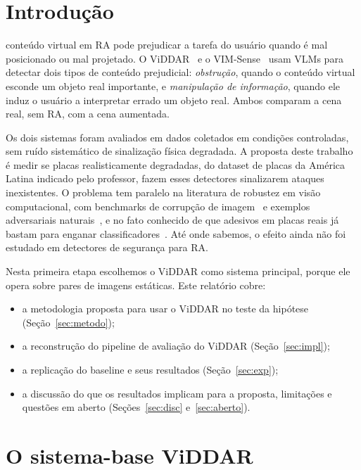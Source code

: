 \documentclass[journal,onecolumn]{IEEEtran}
\begin{document}
\section{Introdução}

 conteúdo virtual em RA pode prejudicar a tarefa do usuário quando é mal posicionado
ou mal projetado. O ViDDAR~\cite{viddar} e o VIM-Sense~\cite{vimsense} usam VLMs para detectar dois
tipos de conteúdo prejudicial: \emph{obstrução}, quando o conteúdo virtual esconde um objeto real
importante, e \emph{manipulação de informação}, quando ele induz o usuário a interpretar errado um
objeto real. Ambos comparam a cena real, sem RA, com a cena aumentada.

Os dois sistemas foram avaliados em dados coletados em condições controladas, sem ruído sistemático de
sinalização física degradada. A proposta deste trabalho é medir se placas realisticamente degradadas,
do dataset de placas da América Latina indicado pelo professor, fazem esses detectores sinalizarem
ataques inexistentes. O problema tem paralelo na literatura de robustez em visão computacional, com
benchmarks de corrupção de imagem~\cite{hendrycks2019} e exemplos adversariais
naturais~\cite{hendrycks2021}, e no fato conhecido de que adesivos em placas reais já bastam para
enganar classificadores~\cite{eykholt2018}. Até onde sabemos, o efeito ainda não foi estudado em
detectores de segurança para RA.

Nesta primeira etapa escolhemos o ViDDAR como sistema principal, porque ele opera sobre pares de
imagens estáticas. Este relatório cobre:
\begin{itemize}
\item a metodologia proposta para usar o ViDDAR no teste da hipótese (Seção~\ref{sec:metodo});
\item a reconstrução do pipeline de avaliação do ViDDAR (Seção~\ref{sec:impl});
\item a replicação do baseline e seus resultados (Seção~\ref{sec:exp});
\item a discussão do que os resultados implicam para a proposta, limitações e questões em aberto
  (Seções~\ref{sec:disc} e~\ref{sec:aberto}).
\end{itemize}

\section{O sistema-base ViDDAR}
\label{sec:viddar}
\end{document}
